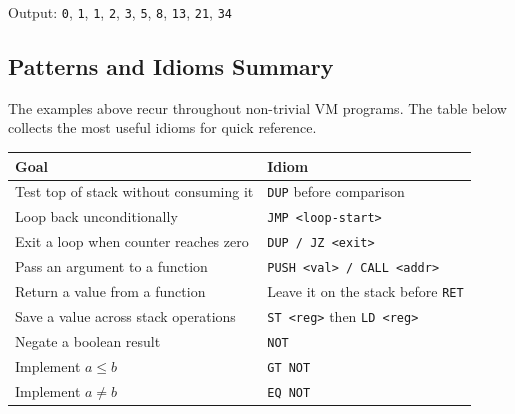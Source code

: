 Output: \texttt{0}, \texttt{1}, \texttt{1}, \texttt{2}, \texttt{3}, \texttt{5}, \texttt{8}, \texttt{13}, \texttt{21}, \texttt{34}

\subsection{Patterns and Idioms Summary}

The examples above recur throughout non-trivial VM programs. The table below collects the most useful idioms for quick reference.

\begin{center}
\begin{tabular}{ll}
\toprule
\textbf{Goal} & \textbf{Idiom} \\
\midrule
Test top of stack without consuming it     & \texttt{DUP} before comparison \\
Loop back unconditionally                  & \texttt{JMP <loop-start>} \\
Exit a loop when counter reaches zero      & \texttt{DUP / JZ <exit>} \\
Pass an argument to a function             & \texttt{PUSH <val> / CALL <addr>} \\
Return a value from a function             & Leave it on the stack before \texttt{RET} \\
Save a value across stack operations       & \texttt{ST <reg>} then \texttt{LD <reg>} \\
Negate a boolean result                    & \texttt{NOT} \\
Implement $a \leq b$                       & \texttt{GT NOT} \\
Implement $a \neq b$                       & \texttt{EQ NOT} \\
\bottomrule
\end{tabular}
\end{center}